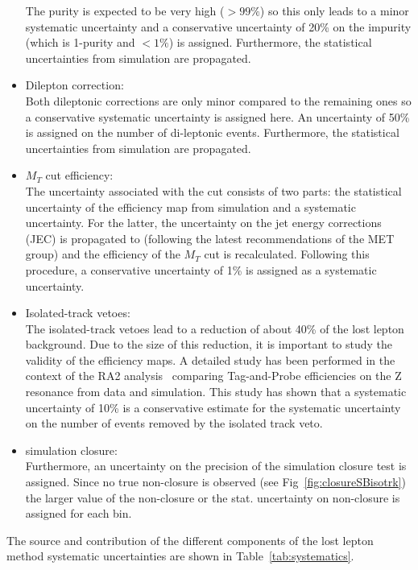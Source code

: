 \begin{itemize}
The purity is expected to be very high ($>99\%$) so this only leads to a minor systematic uncertainty and a conservative uncertainty of 20\% on the impurity (which is 1-purity and $<1\%$) is assigned. Furthermore, the statistical uncertainties from simulation are propagated.
\item Dilepton correction:\\
Both dileptonic corrections are only minor compared to the remaining ones so a conservative systematic uncertainty is assigned here.
An uncertainty of 50\% is assigned on the number of di-leptonic events. Furthermore, the statistical uncertainties from simulation are propagated.
\item $M_T$ cut efficiency:\\
  The uncertainty associated with the \MT cut consists of two parts: the statistical uncertainty of the efficiency map from simulation and a systematic uncertainty. For the latter, the uncertainty on the jet energy corrections (JEC) is propagated to \MET (following the latest recommendations of the MET group) and the efficiency of the $M_T$ cut is recalculated. Following this procedure, a conservative uncertainty of 1\% is assigned as a systematic uncertainty. 
\item Isolated-track vetoes:\\
  The isolated-track vetoes lead to a reduction of about 40\%
  of the lost lepton background. Due to the size of this reduction,
  it is important to study the validity of the efficiency maps. A detailed study has been performed in the context of the RA2 analysis~\cite{Sirunyan:2017cwe} comparing Tag-and-Probe efficiencies on the Z resonance from data and simulation. This study has shown that a systematic uncertainty of 10\% is a conservative estimate for the systematic uncertainty on the number of events removed by the isolated track veto.
\item simulation closure:\\
Furthermore, an uncertainty on the precision of the simulation closure test is assigned. Since no true non-closure is observed (see Fig~\ref{fig:closureSBisotrk}) the larger value of the non-closure or the stat. uncertainty on non-closure is assigned for each bin. 
\end{itemize}

The source and contribution of the different components of the lost lepton method systematic uncertainties are shown in Table~\ref{tab:systematics}.

